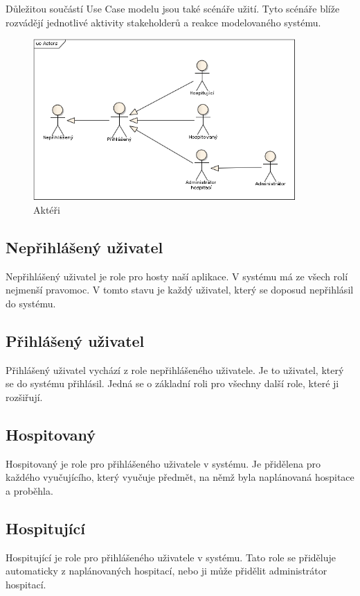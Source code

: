Důležitou součástí Use Case modelu jsou také scénáře užití. Tyto scénáře blíže rozvádějí jednotlivé aktivity stakeholderů a reakce modelovaného systému.

\begin{figure}[H]
\begin{center}
\includegraphics[width=10cm]{figures/Actors}
\caption{Aktéři}
\label{fig:actors}
\end{center}
\end{figure}

\subsection{Nepřihlášený uživatel}
Nepřihlášený uživatel je role pro hosty naší aplikace. V systému má ze všech rolí nejmenší pravomoc. V tomto stavu je každý uživatel, který se doposud nepřihlásil do systému.

\subsection{Přihlášený uživatel}
Přihlášený uživatel vychází z role nepřihlášeného uživatele. Je to uživatel, který se do systému přihlásil. Jedná se o základní roli pro všechny další role, které ji rozšiřují.

\subsection{Hospitovaný}
Hospitovaný je role pro přihlášeného uživatele v systému. Je přidělena pro každého vyučujícího, který vyučuje předmět, na němž byla naplánovaná hospitace a proběhla.

\subsection{Hospitující}
Hospitující je role pro přihlášeného uživatele v systému. Tato role se přiděluje automaticky z naplánovaných hospitací, nebo ji může přidělit administrátor hospitací.


